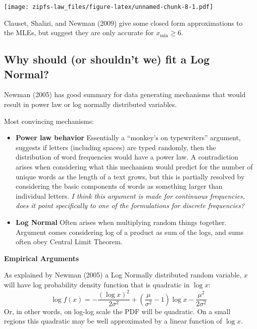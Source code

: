 \documentclass[]{article}
\newenvironment{Shaded}{\begin{snugshade}}{\end{snugshade}}
\newcommand{\CommentTok}[1]{\textcolor[rgb]{0.56,0.35,0.01}{\textit{#1}}}
\newcommand{\DecValTok}[1]{\textcolor[rgb]{0.00,0.00,0.81}{#1}}
\newcommand{\KeywordTok}[1]{\textcolor[rgb]{0.13,0.29,0.53}{\textbf{#1}}}
\newcommand{\NormalTok}[1]{#1}
\newcommand{\OperatorTok}[1]{\textcolor[rgb]{0.81,0.36,0.00}{\textbf{#1}}}
\newcommand{\StringTok}[1]{\textcolor[rgb]{0.31,0.60,0.02}{#1}}
\begin{document}
\texttt{[image: zipfs-law\_files/figure-latex/unnamed-chunk-8-1.pdf]}

Clauset, Shalizi, and Newman (2009) give some closed form approximations
to the MLEs, but suggest they are only accurate for
\(x_\text{min} \ge 6\).

\hypertarget{why-should-or-shouldnt-we-fit-a-log-normal}{%
\subsection{Why should (or shouldn't we) fit a Log
Normal?}\label{why-should-or-shouldnt-we-fit-a-log-normal}}

Newman (2005) has good summary for data generating mechanisms that would
result in power law or log normally distributed variables.

Most convincing mechanisms:

\begin{itemize}
\item
  \textbf{Power law behavior} Essentially a ``monkey's on typewriters''
  argument, suggests if letters (including spaces) are typed randomly,
  then the distribution of word frequencies would have a power law. A
  contradiction arises when considering what this mechanism would
  predict for the number of unique words as the length of a text grows,
  but this is partially resolved by considering the basic components of
  words as something larger than individual letters. \emph{I think this
  argument is made for continuous frequencies, does it point
  specifically to one of the formulations for discrete frequencies?}
\item
  \textbf{Log Normal} Often arises when multiplying random things
  together. Argument comes considering log of a product as sum of the
  logs, and sums often obey Central Limit Theorem.
\end{itemize}

\textbf{Empirical Arguments}

As explained by Newman (2005) a Log Normally distributed random
variable, \(x\) will have log probability density function that is
quadratic in \(\log x\): \[
\log{f(x)} = -\frac{(\log x)^2}{2\sigma^2} + \left(\frac{\mu}{\sigma^2} -1 \right) \log x - \frac{\mu^2}{2\sigma^2}
\] Or, in other words, on log-log scale the PDF will be quadratic. On a
small regions this quadratic may be well approximated by a linear
function of \(\log x\).

\begin{Shaded}
\end{Shaded}
\end{document}
